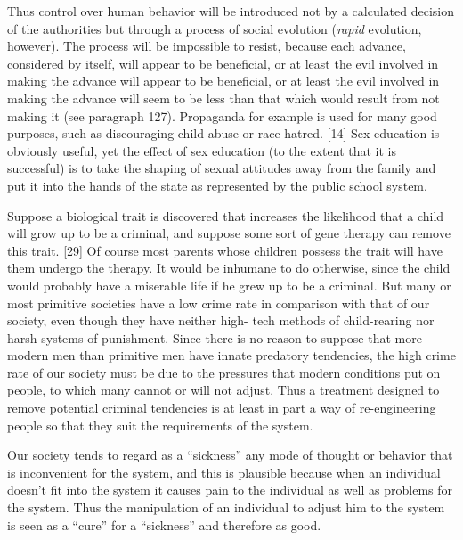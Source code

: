  Thus control over human behavior will be introduced not by a calculated decision of the authorities but through a process of social evolution ({\em rapid} evolution, however). The process will be impossible to resist, because each advance, considered by itself, will appear to be beneficial, or at least the evil involved in making the advance will appear to be beneficial, or at least the evil involved in making the advance will seem to be less than that which would result from not making it (see paragraph 127). Propaganda for example is used for many good purposes, such as discouraging child abuse or race hatred. [14] Sex education is obviously useful, yet the effect of sex education (to the extent that it is successful) is to take the shaping of sexual attitudes away from the family and put it into the hands of the state as represented by the public school system.

 Suppose a biological trait is discovered that increases the likelihood that a child will grow up to be a criminal, and suppose some sort of gene therapy can remove this trait. [29] Of course most parents whose children possess the trait will have them undergo the therapy. It would be inhumane to do otherwise, since the child would probably have a miserable life if he grew up to be a criminal. But many or most primitive societies have a low crime rate in comparison with that of our society, even though they have neither high- tech methods of child-rearing nor harsh systems of punishment. Since there is no reason to suppose that more modern men than primitive men have innate predatory tendencies, the high crime rate of our society must be due to the pressures that modern conditions put on people, to which many cannot or will not adjust. Thus a treatment designed to remove potential criminal tendencies is at least in part a way of re-engineering people so that they suit the requirements of the system.

 Our society tends to regard as a “sickness” any mode of thought or behavior that is inconvenient for the system, and this is plausible because when an individual doesn’t fit into the system it causes pain to the individual as well as problems for the system. Thus the manipulation of an individual to adjust him to the system is seen as a “cure” for a “sickness” and therefore as good.

